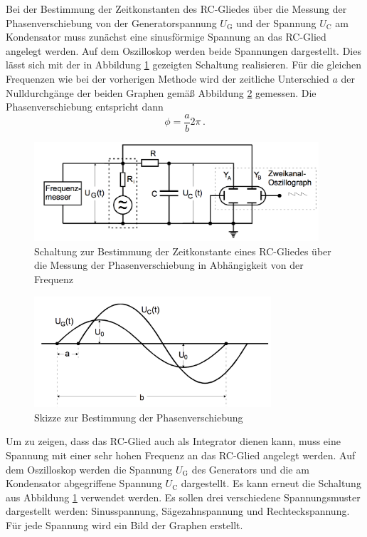 Bei der Bestimmung der Zeitkonstanten des RC-Gliedes über die Messung der Phasenverschiebung
von der Generatorspannung $U_{\text{G}}$ und der Spannung $U_{\text{C}}$ am Kondensator
muss zunächst eine sinusförmige Spannung an das RC-Glied angelegt werden.
Auf dem Oszilloskop werden beide Spannungen dargestellt. Dies lässt sich mit der in Abbildung \ref{fig:Schaltung_4c}
gezeigten Schaltung realisieren. Für die gleichen Frequenzen wie bei der vorherigen
Methode wird der zeitliche Unterschied $a$ der Nulldurchgänge der beiden Graphen gemäß Abbildung
\ref{fig:phasenverschiebung} gemessen. Die Phasenverschiebung entspricht dann
\begin{equation}
  \phi=\frac{a}{b}2\pi\,.
  \label{eqn:ab2phi}
\end{equation}

\begin{figure}
  \centering
  \includegraphics[width=300pt]{data/4c_schaltung.png}
  \caption{Schaltung zur Bestimmung der Zeitkonstante eines RC-Gliedes über die Messung
  der Phasenverschiebung in Abhängigkeit von der Frequenz \cite{Versuchsanleitung}}
  \label{fig:Schaltung_4c}
\end{figure}

\begin{figure}
  \centering
  \includegraphics[width=250pt]{data/phasenverschiebung.png}
  \caption{Skizze zur Bestimmung der Phasenverschiebung \cite{Versuchsanleitung}}
  \label{fig:phasenverschiebung}
\end{figure}

Um zu zeigen, dass das RC-Glied auch als Integrator dienen kann, muss eine Spannung
mit einer sehr hohen Frequenz an das RC-Glied angelegt werden.
Auf dem Oszilloskop werden die Spannung $U_{\text{G}}$ des Generators und
die am Kondensator abgegriffene Spannung $U_{\text{C}}$ dargestellt. Es kann erneut die Schaltung
aus Abbildung \ref{fig:Schaltung_4c} verwendet werden. Es sollen drei verschiedene
Spannungsmuster dargestellt werden: Sinusspannung, Sägezahnspannung und Rechteckspannung.
Für jede Spannung wird ein Bild der Graphen erstellt.
